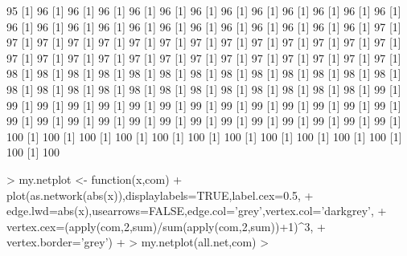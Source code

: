 \documentclass[12pt]{article}
\begin{document}
\begin{Schunk}
\begin{Soutput}
[1] 95%
[1] 96%
[1] 96%
[1] 96%
[1] 96%
[1] 96%
[1] 96%
[1] 96%
[1] 96%
[1] 96%
[1] 96%
[1] 96%
[1] 96%
[1] 96%
[1] 96%
[1] 96%
[1] 96%
[1] 96%
[1] 96%
[1] 96%
[1] 96%
[1] 96%
[1] 96%
[1] 96%
[1] 96%
[1] 97%
[1] 97%
[1] 97%
[1] 97%
[1] 97%
[1] 97%
[1] 97%
[1] 97%
[1] 97%
[1] 97%
[1] 97%
[1] 97%
[1] 97%
[1] 97%
[1] 97%
[1] 97%
[1] 97%
[1] 97%
[1] 97%
[1] 97%
[1] 97%
[1] 97%
[1] 97%
[1] 97%
[1] 97%
[1] 97%
[1] 97%
[1] 98%
[1] 98%
[1] 98%
[1] 98%
[1] 98%
[1] 98%
[1] 98%
[1] 98%
[1] 98%
[1] 98%
[1] 98%
[1] 98%
[1] 98%
[1] 98%
[1] 98%
[1] 98%
[1] 98%
[1] 98%
[1] 98%
[1] 98%
[1] 98%
[1] 98%
[1] 98%
[1] 98%
[1] 98%
[1] 99%
[1] 99%
[1] 99%
[1] 99%
[1] 99%
[1] 99%
[1] 99%
[1] 99%
[1] 99%
[1] 99%
[1] 99%
[1] 99%
[1] 99%
[1] 99%
[1] 99%
[1] 99%
[1] 99%
[1] 99%
[1] 99%
[1] 99%
[1] 99%
[1] 99%
[1] 99%
[1] 99%
[1] 99%
[1] 99%
[1] 99%
[1] 100%
[1] 100%
[1] 100%
[1] 100%
[1] 100%
[1] 100%
[1] 100%
[1] 100%
[1] 100%
[1] 100%
[1] 100%
[1] 100%
[1] 100%
\end{Soutput}
\begin{Sinput}
> my.netplot <- function(x,com){
+   plot(as.network(abs(x)),displaylabels=TRUE,label.cex=0.5,
+        edge.lwd=abs(x),usearrows=FALSE,edge.col='grey',vertex.col='darkgrey',
+        vertex.cex=(apply(com,2,sum)/sum(apply(com,2,sum))+1)^3,
+        vertex.border='grey')
+ }
> my.netplot(all.net,com)
> 
\end{Sinput}
\end{Schunk}
\end{document}

